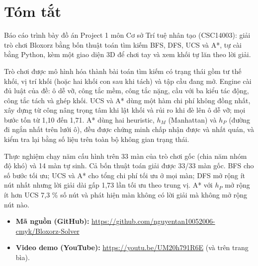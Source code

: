 \section{Tóm tắt}

Báo cáo trình bày đồ án Project 1 môn Cơ sở Trí tuệ nhân tạo (CSC14003): giải trò chơi Bloxorz bằng bốn thuật toán tìm kiếm BFS, DFS, UCS và A*, tự cài bằng Python, kèm một giao diện 3D để chơi tay và xem khối tự lăn theo lời giải.

Trò chơi được mô hình hóa thành bài toán tìm kiếm có trạng thái gồm tư thế khối, vị trí khối (hoặc hai khối con sau khi tách) và tập cầu đang mở. Engine cài đủ luật của đề: ô dễ vỡ, công tắc mềm, công tắc nặng, cầu với ba kiểu tác động, công tắc tách và ghép khối. UCS và A* dùng một hàm chi phí không đồng nhất, xây dựng từ công nâng trọng tâm khi lật khối và rủi ro khi đè lên ô dễ vỡ; mọi bước tốn từ 1,10 đến 1,71. A* dùng hai heuristic, \(h_M\) (Manhattan) và \(h_P\) (đường đi ngắn nhất trên lưới ô), đều được chứng minh chấp nhận được và nhất quán, và kiểm tra lại bằng số liệu trên toàn bộ không gian trạng thái.

Thực nghiệm chạy năm cấu hình trên 33 màn của trò chơi gốc (chia năm nhóm độ khó) và 14 màn tự sinh. Cả bốn thuật toán giải được 33/33 màn gốc. BFS cho số bước tối ưu; UCS và A* cho tổng chi phí tối ưu ở mọi màn; DFS mở rộng ít nút nhất nhưng lời giải dài gấp 1,73 lần tối ưu theo trung vị. A* với \(h_P\) mở rộng ít hơn UCS 7,3 \% số nút và phát hiện màn không có lời giải mà không mở rộng nút nào.

\begin{itemize}
\tightlist
\item
  \textbf{Mã nguồn (GitHub):} \href{https://github.com/nguyentan10052006-cmyk/Bloxorz-Solver}{\url{https://github.com/nguyentan10052006-cmyk/Bloxorz-Solver}}
\item
  \textbf{Video demo (YouTube):} \href{https://youtu.be/UM20h791R6E}{\url{https://youtu.be/UM20h791R6E}} (và trên trang bìa).
\end{itemize}
